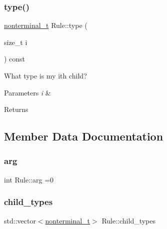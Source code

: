 \subsubsection{\texorpdfstring{type()}{type()}}
{\footnotesize\ttfamily \hyperlink{_nonterminal_8h_a1c5bfe9b903f69c83bbde5da7035fef3}{nonterminal\+\_\+t} Rule\+::type (\begin{DoxyParamCaption}\item[{size\+\_\+t}]{i }\end{DoxyParamCaption}) const\hspace{0.3cm}{\ttfamily [inline]}}

What type is my i\textquotesingle{}th child? 
\begin{DoxyParams}{Parameters}
{\em i} & \\
\hline
\end{DoxyParams}
\begin{DoxyReturn}{Returns}

\end{DoxyReturn}


\subsection{Member Data Documentation}
\mbox{\label{class_rule_a79eeb901b01047328f093d31724bd512}} 
\subsubsection{\texorpdfstring{arg}{arg}}
{\footnotesize\ttfamily int Rule\+::arg =0}

\mbox{\label{class_rule_afdd38b9432cea46b5cea54b1bb841c07}} 
\subsubsection{\texorpdfstring{child\+\_\+types}{child\_types}}
{\footnotesize\ttfamily std\+::vector$<$\hyperlink{_nonterminal_8h_a1c5bfe9b903f69c83bbde5da7035fef3}{nonterminal\+\_\+t}$>$ Rule\+::child\+\_\+types\hspace{0.3cm}{\ttfamily [protected]}}

\mbox{\label{class_rule_a3ffb425ebd6c508ca47234e3800f769c}} 

